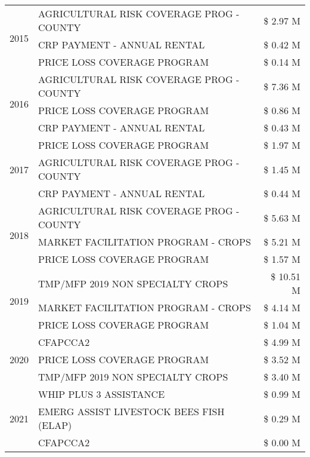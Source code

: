\begin{tabular}{llr}
\multirow[t]{3}{*}{2015} & AGRICULTURAL RISK COVERAGE PROG - COUNTY & \$ 2.97 M \\
 & CRP PAYMENT - ANNUAL RENTAL & \$ 0.42 M \\
 & PRICE LOSS COVERAGE PROGRAM & \$ 0.14 M \\
\cline{1-3}
\multirow[t]{3}{*}{2016} & AGRICULTURAL RISK COVERAGE PROG - COUNTY & \$ 7.36 M \\
 & PRICE LOSS COVERAGE PROGRAM & \$ 0.86 M \\
 & CRP PAYMENT - ANNUAL RENTAL & \$ 0.43 M \\
\cline{1-3}
\multirow[t]{3}{*}{2017} & PRICE LOSS COVERAGE PROGRAM & \$ 1.97 M \\
 & AGRICULTURAL RISK COVERAGE PROG - COUNTY & \$ 1.45 M \\
 & CRP PAYMENT - ANNUAL RENTAL & \$ 0.44 M \\
\cline{1-3}
\multirow[t]{3}{*}{2018} & AGRICULTURAL RISK COVERAGE PROG - COUNTY & \$ 5.63 M \\
 & MARKET FACILITATION PROGRAM - CROPS & \$ 5.21 M \\
 & PRICE LOSS COVERAGE PROGRAM & \$ 1.57 M \\
\cline{1-3}
\multirow[t]{3}{*}{2019} & TMP/MFP 2019 NON SPECIALTY CROPS & \$ 10.51 M \\
 & MARKET FACILITATION PROGRAM - CROPS & \$ 4.14 M \\
 & PRICE LOSS COVERAGE PROGRAM & \$ 1.04 M \\
\cline{1-3}
\multirow[t]{3}{*}{2020} & CFAPCCA2 & \$ 4.99 M \\
 & PRICE LOSS COVERAGE PROGRAM & \$ 3.52 M \\
 & TMP/MFP 2019 NON SPECIALTY CROPS & \$ 3.40 M \\
\cline{1-3}
\multirow[t]{3}{*}{2021} & WHIP PLUS 3 ASSISTANCE & \$ 0.99 M \\
 & EMERG ASSIST LIVESTOCK BEES FISH (ELAP) & \$ 0.29 M \\
 & CFAPCCA2 & \$ 0.00 M \\
\cline{1-3}
\bottomrule
\end{tabular}
